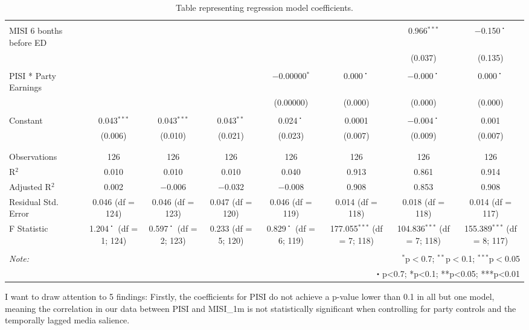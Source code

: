 \documentclass[11pt,a4paper]{article}
\begin{document}
\begin{table}
{\begin{tabular}{@{\extracolsep{50pt}}lccccccc}
      & & & & & & & \\ 
     MISI 6 bonths before ED &  &  &  &  &  & 0.966$^{***}$ & $-$0.150$^{・}$ \\ 
      &  &  &  &  &  & (0.037) & (0.135) \\ 
      & & & & & & & \\ 
     PISI * Party Earnings &  &  &  & $-$0.00000$^{*}$ & 0.000$^{・}$ & $-$0.000$^{・}$ & 0.000$^{・}$ \\ 
      &  &  &  & (0.00000) & (0.000) & (0.000) & (0.000) \\ 
      & & & & & & & \\ 
     Constant & 0.043$^{***}$ & 0.043$^{***}$ & 0.043$^{**}$ & 0.024$^{・}$ & 0.0001 & $-$0.004$^{・}$ & 0.001 \\ 
      & (0.006) & (0.010) & (0.021) & (0.023) & (0.007) & (0.009) & (0.007) \\ 
      & & & & & & & \\ 
    \hline \\[-1.8ex] 
    Observations & 126 & 126 & 126 & 126 & 126 & 126 & 126 \\ 
    R$^{2}$ & 0.010 & 0.010 & 0.010 & 0.040 & 0.913 & 0.861 & 0.914 \\ 
    Adjusted R$^{2}$ & 0.002 & $-$0.006 & $-$0.032 & $-$0.008 & 0.908 & 0.853 & 0.908 \\ 
    Residual Std. Error & 0.046 (df = 124) & 0.046 (df = 123) & 0.047 (df = 120) & 0.046 (df = 119) & 0.014 (df = 118) & 0.018 (df = 118) & 0.014 (df = 117) \\ 
    F Statistic & 1.204$^{・}$ (df = 1; 124) & 0.597$^{・}$ (df = 2; 123) & 0.233 (df = 5; 120) & 0.829$^{・}$ (df = 6; 119) & 177.055$^{***}$ (df = 7; 118) & 104.836$^{***}$ (df = 7; 118) & 155.389$^{***}$ (df = 8; 117) \\ 
    \hline 
    \hline \\[-1.8ex] 
    \textit{Note:}  & \multicolumn{7}{r}{$^{*}$p$<$0.7; $^{**}$p$<$0.1; $^{***}$p$<$0.05} \\ 
     & \multicolumn{7}{r}{・p<0.7; *p<0.1; **p<0.05; ***p<0.01} \\ 
    \end{tabular}
    }
    \caption{Table representing regression model coefficients.}
    \label{tab:my_label}
\end{table}


I want to draw attention to 5 findings: Firstly, the coefficients for PISI do not achieve a p-value lower than 0.1 in all but one model, meaning the correlation in our data between PISI and MISI\_1m is not statistically significant when controlling for party controls and the temporally lagged media salience.
\end{document}
